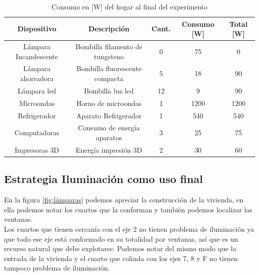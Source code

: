 \documentclass[]{article}
\begin{document}
\begin{table}[h!]
\centering

\begin{tabular}{|c|c|c|c|c|}
\hline
Dispositivo           & Descripción                     & Cant. & Consumo {[}W{]} & Total [W] \\ \hline
Lámpara Incandescente & Bombilla filamento de tungsteno & 0                  & 75              & 0           \\ \hline
Lámpara ahorradora    & Bombilla fluorescente compacta  & 5                 & 18              & 90           \\ \hline
Lámpara led           & Bombilla luz led                & 12                  & 9               & 90            \\ \hline
Microondas            & Horno de microondas             & 1                  & 1200            & 1200          \\ \hline
Refrigerador          & Aparato Refrigerador            & 1                  & 540             & 540           \\ \hline
Computadoras          & Consumo de energía aparatos     & 3                  & 25              & 75            \\ \hline
Impresoras 3D         & Energía impresión 3D            & 2                  & 30              & 60            \\ \hline
\end{tabular}
\caption{Consumo en [W] del hogar al final del experimento}
\label{tablaConsumoSegundo}
\end{table}

\subsection{Estrategia Iluminación como uso final}

En la figura \ref{fig:lámparas} podemos apreciar la construcción de la vivienda, en ella podemos notar los cuartos que la conforman y también podemos localizar las ventanas.\\

Los cuartos que tienen cercanía con el eje 2 no tienen problema de iluminación ya que todo ese eje está conformado en su totalidad por ventanas, así que es un recurso natural que debe explotarse. Podemos notar del mismo modo que la entrada de la vivienda y el cuarto que colinda con los ejes 7, 8 y F no tienen tampoco problema de iluminación.\\
\end{document}
